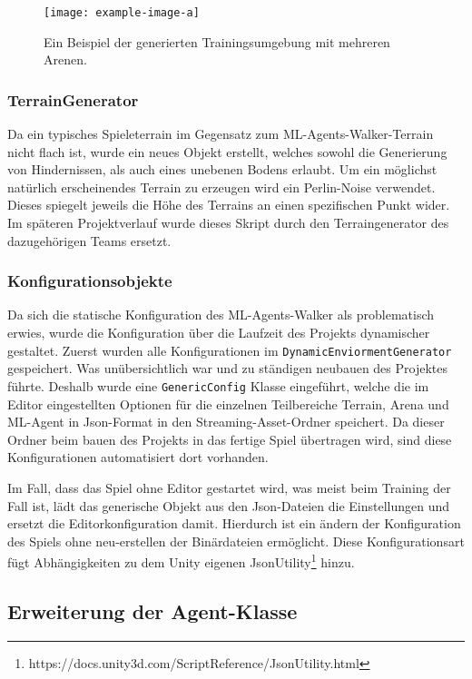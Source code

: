 \begin{figure}
	\centering
	\texttt{[image: example-image-a]}
	\caption[Beispiel der generierten Trainingsumgebung]{Ein Beispiel der generierten Trainingsumgebung mit mehreren Arenen.} %
	\label{bspArena}
\end{figure}

\subsubsection{TerrainGenerator}
Da ein typisches Spieleterrain im Gegensatz zum ML-Agents-Walker-Terrain nicht flach ist, wurde ein neues Objekt erstellt, welches sowohl die Generierung von Hindernissen, als auch eines unebenen Bodens erlaubt. Um ein möglichst natürlich erscheinendes Terrain zu erzeugen wird ein Perlin-Noise verwendet. Dieses spiegelt jeweils die Höhe des Terrains an einen spezifischen Punkt wider. Im späteren Projektverlauf wurde dieses Skript durch den Terraingenerator des dazugehörigen Teams ersetzt.

\subsubsection{Konfigurationsobjekte}
Da sich die statische Konfiguration des ML-Agents-Walker als problematisch erwies, wurde die Konfiguration über die Laufzeit des Projekts dynamischer gestaltet. Zuerst wurden alle Konfigurationen im \texttt{DynamicEnviormentGenerator} gespeichert. Was unübersichtlich war und zu ständigen neubauen des Projektes führte. Deshalb wurde eine \texttt{GenericConfig} Klasse eingeführt, welche die im Editor eingestellten Optionen für die einzelnen Teilbereiche Terrain, Arena und ML-Agent in Json-Format in den Streaming-Asset-Ordner speichert. Da dieser Ordner beim bauen des Projekts in das fertige Spiel übertragen wird, sind diese Konfigurationen automatisiert dort vorhanden. 

Im Fall, dass das Spiel ohne Editor gestartet wird, was meist beim Training der Fall ist, lädt das generische Objekt aus den Json-Dateien die Einstellungen und ersetzt die Editorkonfiguration damit. Hierdurch ist ein ändern der Konfiguration des Spiels ohne neu-erstellen der Binärdateien ermöglicht. Diese Konfigurationsart fügt Abhängigkeiten zu dem Unity eigenen JsonUtility\footnote{https://docs.unity3d.com/ScriptReference/JsonUtility.html} hinzu.

\subsection{Erweiterung der Agent-Klasse}

